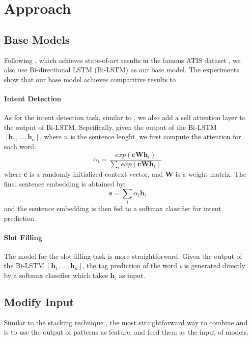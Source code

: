 \section{Approach}
\subsection{Base Models}
Following \cite{liu2016attention}, which achieves state-of-art results in the famous ATIS \NLU dataset \cite{hemphill1990atis}, we also use Bi-directional LSTM (Bi-LSTM) as our base \NN model. The experiments show that our base model achieves comparitive results to \cite{liu2016attention}.
\paragraph{Intent Detection}
As for the intent detection task, similar to \cite{liu2016attention}, we also add a self attention layer to the output of Bi-LSTM. Sepcifically, given the output of the Bi-LSTM $[\textbf{h}_1, ..., \textbf{h}_n]$, where $n$ is the sentence lenght, we first compute the attention for each word:
\begin{equation}
\alpha_i=\frac{exp(\textbf{cWh}_i)}{\sum_{i}{exp(\textbf{cWh}_i)}}
\end{equation}
where $\textbf{c}$ is a randomly initialized context vector, and $\textbf{W}$ is a weight matrix. The final sentence embedding is abtained by: 
\begin{equation}
\textbf{s} = \sum_{i}{\alpha_i\textbf{h}_i}
\end{equation}
and the sentence embedding is then fed to a softmax classifier for intent prediction.

\paragraph{Slot Filling}
The model for the slot filling task is more straightforward. Given the output of the Bi-LSTM $[\textbf{h}_1, ..., \textbf{h}_n]$, the tag prediction of the word $i$ is generated directly by a softmax classifier which takes $\textbf{h}_i$ as input.


\subsection{Modify Input}
Similar to the stacking technique \cite{wolpert1992stacked}, the most straightforward way to combine \RE and \NN is to use the output of \RE patterns as feature, and feed them as the input of \NN models.
